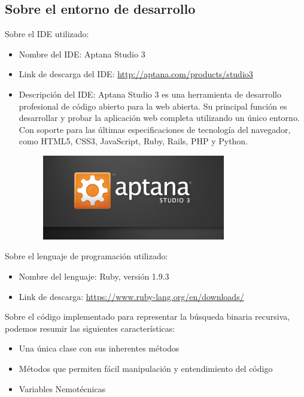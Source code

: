 \subsection{Sobre el entorno de desarrollo}

Sobre el IDE utilizado:
\begin{itemize}
\item Nombre del IDE: Aptana Studio 3
\item Link de descarga del IDE: \url{http://aptana.com/products/studio3}
\item Descripción del IDE: Aptana Studio 3 es una herramienta de desarrollo profesional de código abierto para la web abierta. Su principal función es desarrollar y probar la aplicación web completa utilizando un único entorno. Con soporte para las últimas especificaciones de tecnología del navegador, como HTML5, CSS3, JavaScript, Ruby, Rails, PHP y Python.
\begin{figure}[h]
\centering
    \includegraphics[width=8cm]{aptana-logo.png}
\end{figure}
\end{itemize}

Sobre el lenguaje de programación utilizado:
\begin{itemize}
\item Nombre del lenguaje: Ruby, versión 1.9.3
\item Link de descarga: \url{https://www.ruby-lang.org/en/downloads/}
\end{itemize}

Sobre el código implementado para representar la búsqueda binaria recursiva, podemos resumir las siguientes características:
\begin{itemize}
\item Una única clase con sus inherentes métodos
\item Métodos que permiten fácil manipulación y entendimiento del código
\item Variables Nemotécnicas
\end{itemize}

